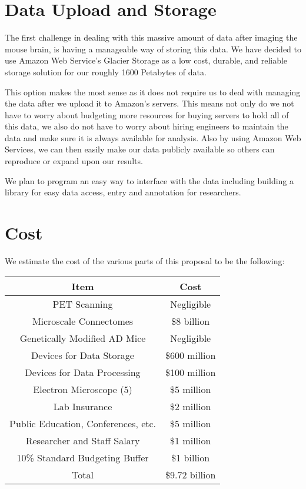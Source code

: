\documentclass[11pt]{article}
\begin{document}
\section{Data Upload and Storage}

The first challenge in dealing with this massive amount of data after imaging the mouse brain, is having a manageable way of storing this data. We have decided to use Amazon Web Service's Glacier Storage as a low cost, durable, and reliable storage solution for our roughly 1600 Petabytes of data. 

This option makes the most sense as it does not require us to deal with managing the data after we upload it to Amazon's servers. This means not only do we not have to worry about budgeting more resources for buying servers to hold all of this data, we also do not have to worry about hiring engineers to maintain the data and make sure it is always available for analysis.  Also by using Amazon Web Services, we can then easily make our data publicly available so others can reproduce or expand upon our results.

We plan to program an easy way to interface with the data including building a library for easy data access, entry and annotation for researchers.

\section{Cost}

We estimate the cost of the various parts of this proposal to be the following:

\begin{center}
 \begin{tabular}{||c c||} 
 \hline
 Item & Cost \\ [0.5ex] 
 \hline\hline
 PET Scanning & Negligible \\ 
 \hline
 Microscale Connectomes & \$8 billion \\
 \hline
 Genetically Modified AD Mice & Negligible \\
 \hline
 Devices for Data Storage & \$600 million  \\
 \hline
 Devices for Data Processing & \$100 million  \\
 \hline
 Electron Microscope (5) &  \$5 million\\ 
 \hline
 Lab Insurance & \$2 million \\ 
 \hline
 Public Education, Conferences, etc. & \$5 million \\ 
 \hline
 Researcher and Staff Salary & \$1 million \\ 
 \hline
 10\% Standard Budgeting Buffer & \$1 billion \\[1ex] 
 \hline\hline
 Total & \$9.72 billion \\
 \hline
\end{tabular}
\end{center}
\end{document}
